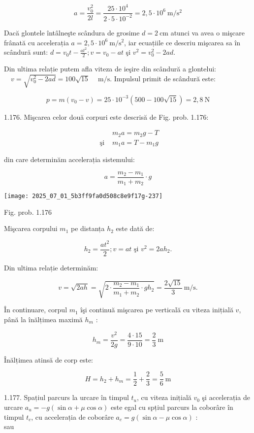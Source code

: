 $$
a=\frac{v_{0}^{2}}{2 l}=\frac{25 \cdot 10^{4}}{2 \cdot 5 \cdot 10^{-2}}=2,5 \cdot 10^{6} \mathrm{~m} / \mathrm{s}^{2}
$$

Dacă glontele întâlneşte scândura de grosime $d=2 \mathrm{~cm}$ atunci va avea o mişcare frânată cu accelerația $a=2,5 \cdot 10^{6} \mathrm{~m} / \mathrm{s}^{2}$, iar ecuațiile ce descriu mişcarea sa în scândură sunt: $d=v_{0} t-\frac{a t^{2}}{2} ; v=v_{0}-a t$ şi $v^{2}=v_{0}^{2}-2 a d$.

Din ultima relație putem afla viteza de ieşire din scândură a glontelui: $\quad v=\sqrt{v_{0}^{2}-2 a d}=100 \sqrt{15} \quad \mathrm{~m} / \mathrm{s}$. Impulsul primit de scândură este:

$$
p=m\left(v_{0}-v\right)=25 \cdot 10^{-3}(500-100 \sqrt{15})=2,8 \mathrm{~N}
$$

1.176. Mişcarea celor două corpuri este descrisă de Fig. prob. 1.176:

$$
\begin{array}{ll} 
& m_{2} a=m_{2} g-T \\
\text { şi } & m_{1} a=T-m_{1} g
\end{array}
$$

din care determinăm accelerația sistemului:

$$
a=\frac{m_{2}-m_{1}}{m_{1}+m_{2}} \cdot g
$$

\begin{center}
\texttt{[image: 2025\_07\_01\_5b3ff9fa0d508c8e9f17g-237]}
\end{center}

Fig. prob. 1.176

Mişcarea corpului $m_{1}$ pe distanța $h_{2}$ este dată de:

$$
h_{2}=\frac{a t^{2}}{2} ; v=a t \text { şi } v^{2}=2 a h_{2} .
$$

Din ultima relație determinăm:

$$
v=\sqrt{2 a h}=\sqrt{2 \cdot \frac{m_{2}-m_{1}}{m_{1}+m_{2}} \cdot g h_{2}}=\frac{2 \sqrt{15}}{3} \mathrm{~m} / \mathrm{s} .
$$

În continuare, corpul $m_{1}$ îşi continuă mişcarea pe verticală cu viteza inițială $v$, până la înălțimea maximă $h_{m}$ :

$$
h_{m}=\frac{v^{2}}{2 g}=\frac{4 \cdot 15}{9 \cdot 10}=\frac{2}{3} \mathrm{~m}
$$

Înălțimea atinsă de corp este:

$$
H=h_{2}+h_{m}=\frac{1}{2}+\frac{2}{3}=\frac{5}{6} \mathrm{~m}
$$

1.177. Spațiul parcurs la urcare în timpul $t_{u}$, cu viteza inițială $v_{0}$ şi accelerația de urcare $a_{u}=-g(\sin \alpha+\mu \cos \alpha)$ este egal cu spțiul parcurs la coborâre în timpul $t_{c}$, cu accelerația de coborâre $a_{c}=g(\sin \alpha-\mu \cos \alpha)$ :\\
sau

